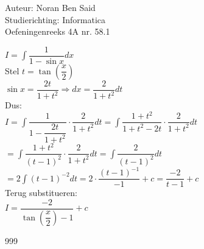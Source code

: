 \documentclass[a4paper]{article}
\begin{document}
\noindent \large Auteur: Noran Ben Said \\
\noindent \large Studierichting:  Informatica\\
\noindent \large Oefeningenreeks 4A nr. 58.1\\

\medskip

\normalsize

$I = \displaystyle\int \dfrac{1}{1-\sin x}dx$\\

Stel $ t=\tan\left(\dfrac{x}{2}\right)$\\

$ \sin x=\dfrac{2t}{1+t^2} \Rightarrow dx=\dfrac{2}{1+t^2}dt$\\

Dus:\\

$ I=\displaystyle\int\dfrac{1}{1-\dfrac{2t}{1+t^2}}\cdot\dfrac{2}{1+t^2}dt=\displaystyle\int\dfrac{1+t^2}{1+t^2-2t}\cdot\dfrac{2}{1+t^2}dt$\\

$ =\displaystyle\int\dfrac{1+t^2}{(t-1)^2}\cdot\dfrac{2}{1+t^2}dt=\displaystyle\int\dfrac{2}{(t-1)^2}dt$\\

$ =2\displaystyle\int (t-1)^{-2}dt=2\cdot\dfrac{(t-1)^{-1}}{-1}+c=\dfrac{-2}{t-1}+c$\\

Terug substitueren:\\

$ I=\dfrac{-2}{\tan\left(\dfrac{x}{2}\right)-1}+c$\\

\begin{thebibliography}{999}
\end{thebibliography}
\end{document}
